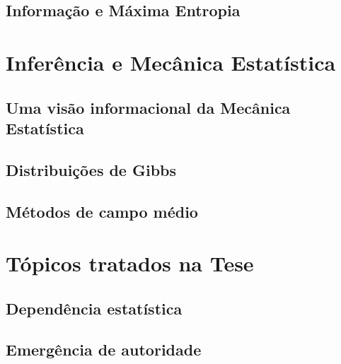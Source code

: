 \subsection{Informação e Máxima Entropia}

\section{Inferência e Mecânica Estatística}
\subsection{Uma visão informacional da Mecânica Estatística}
\subsection{Distribuições de Gibbs}
\subsection{Métodos de campo médio}

\section{Tópicos tratados na Tese}
\subsection{Dependência estatística}
\subsection{Emergência de autoridade}